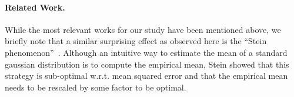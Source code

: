 % 
%
%
\paragraph{Related Work.} While the most relevant works for our study have been mentioned above, we briefly note that a similar surprising effect as observed here is the ``Stein phenomenon''~\cite{Stein56,JamesStein61}. Although an intuitive way to estimate the mean of a standard gaussian distribution is to compute the empirical mean, Stein showed that this strategy is sub-optimal w.r.t. mean squared error and that the empirical mean needs to be rescaled by some factor to be optimal.
